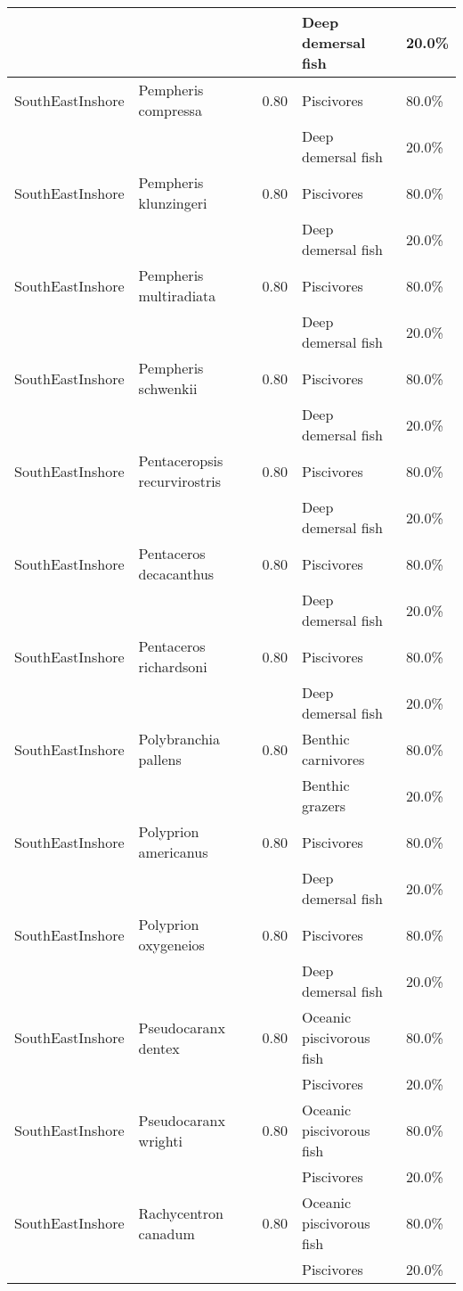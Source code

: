 \begin{longtable}{llcll}
& & & Deep demersal fish & 20.0\% \\
\hline
SouthEastInshore & Pempheris compressa & 0.80 & Piscivores & 80.0\% \\
& & & Deep demersal fish & 20.0\% \\
\hline
SouthEastInshore & Pempheris klunzingeri & 0.80 & Piscivores & 80.0\% \\
& & & Deep demersal fish & 20.0\% \\
\hline
SouthEastInshore & Pempheris multiradiata & 0.80 & Piscivores & 80.0\% \\
& & & Deep demersal fish & 20.0\% \\
\hline
SouthEastInshore & Pempheris schwenkii & 0.80 & Piscivores & 80.0\% \\
& & & Deep demersal fish & 20.0\% \\
\hline
SouthEastInshore & Pentaceropsis recurvirostris & 0.80 & Piscivores & 80.0\% \\
& & & Deep demersal fish & 20.0\% \\
\hline
SouthEastInshore & Pentaceros decacanthus & 0.80 & Piscivores & 80.0\% \\
& & & Deep demersal fish & 20.0\% \\
\hline
SouthEastInshore & Pentaceros richardsoni & 0.80 & Piscivores & 80.0\% \\
& & & Deep demersal fish & 20.0\% \\
\hline
SouthEastInshore & Polybranchia pallens & 0.80 & Benthic carnivores & 80.0\% \\
& & & Benthic grazers & 20.0\% \\
\hline
SouthEastInshore & Polyprion americanus & 0.80 & Piscivores & 80.0\% \\
& & & Deep demersal fish & 20.0\% \\
\hline
SouthEastInshore & Polyprion oxygeneios & 0.80 & Piscivores & 80.0\% \\
& & & Deep demersal fish & 20.0\% \\
\hline
SouthEastInshore & Pseudocaranx dentex & 0.80 & Oceanic piscivorous fish & 80.0\% \\
& & & Piscivores & 20.0\% \\
\hline
SouthEastInshore & Pseudocaranx wrighti & 0.80 & Oceanic piscivorous fish & 80.0\% \\
& & & Piscivores & 20.0\% \\
\hline
SouthEastInshore & Rachycentron canadum & 0.80 & Oceanic piscivorous fish & 80.0\% \\
& & & Piscivores & 20.0\% \\

\end{longtable}
